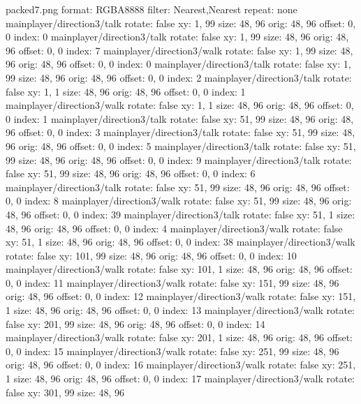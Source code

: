 packed7.png
format: RGBA8888
filter: Nearest,Nearest
repeat: none
mainplayer/direction3/talk
  rotate: false
  xy: 1, 99
  size: 48, 96
  orig: 48, 96
  offset: 0, 0
  index: 0
mainplayer/direction3/talk
  rotate: false
  xy: 1, 99
  size: 48, 96
  orig: 48, 96
  offset: 0, 0
  index: 7
mainplayer/direction3/walk
  rotate: false
  xy: 1, 99
  size: 48, 96
  orig: 48, 96
  offset: 0, 0
  index: 0
mainplayer/direction3/talk
  rotate: false
  xy: 1, 99
  size: 48, 96
  orig: 48, 96
  offset: 0, 0
  index: 2
mainplayer/direction3/talk
  rotate: false
  xy: 1, 1
  size: 48, 96
  orig: 48, 96
  offset: 0, 0
  index: 1
mainplayer/direction3/walk
  rotate: false
  xy: 1, 1
  size: 48, 96
  orig: 48, 96
  offset: 0, 0
  index: 1
mainplayer/direction3/talk
  rotate: false
  xy: 51, 99
  size: 48, 96
  orig: 48, 96
  offset: 0, 0
  index: 3
mainplayer/direction3/talk
  rotate: false
  xy: 51, 99
  size: 48, 96
  orig: 48, 96
  offset: 0, 0
  index: 5
mainplayer/direction3/talk
  rotate: false
  xy: 51, 99
  size: 48, 96
  orig: 48, 96
  offset: 0, 0
  index: 9
mainplayer/direction3/talk
  rotate: false
  xy: 51, 99
  size: 48, 96
  orig: 48, 96
  offset: 0, 0
  index: 6
mainplayer/direction3/talk
  rotate: false
  xy: 51, 99
  size: 48, 96
  orig: 48, 96
  offset: 0, 0
  index: 8
mainplayer/direction3/walk
  rotate: false
  xy: 51, 99
  size: 48, 96
  orig: 48, 96
  offset: 0, 0
  index: 39
mainplayer/direction3/talk
  rotate: false
  xy: 51, 1
  size: 48, 96
  orig: 48, 96
  offset: 0, 0
  index: 4
mainplayer/direction3/walk
  rotate: false
  xy: 51, 1
  size: 48, 96
  orig: 48, 96
  offset: 0, 0
  index: 38
mainplayer/direction3/walk
  rotate: false
  xy: 101, 99
  size: 48, 96
  orig: 48, 96
  offset: 0, 0
  index: 10
mainplayer/direction3/walk
  rotate: false
  xy: 101, 1
  size: 48, 96
  orig: 48, 96
  offset: 0, 0
  index: 11
mainplayer/direction3/walk
  rotate: false
  xy: 151, 99
  size: 48, 96
  orig: 48, 96
  offset: 0, 0
  index: 12
mainplayer/direction3/walk
  rotate: false
  xy: 151, 1
  size: 48, 96
  orig: 48, 96
  offset: 0, 0
  index: 13
mainplayer/direction3/walk
  rotate: false
  xy: 201, 99
  size: 48, 96
  orig: 48, 96
  offset: 0, 0
  index: 14
mainplayer/direction3/walk
  rotate: false
  xy: 201, 1
  size: 48, 96
  orig: 48, 96
  offset: 0, 0
  index: 15
mainplayer/direction3/walk
  rotate: false
  xy: 251, 99
  size: 48, 96
  orig: 48, 96
  offset: 0, 0
  index: 16
mainplayer/direction3/walk
  rotate: false
  xy: 251, 1
  size: 48, 96
  orig: 48, 96
  offset: 0, 0
  index: 17
mainplayer/direction3/walk
  rotate: false
  xy: 301, 99
  size: 48, 96
